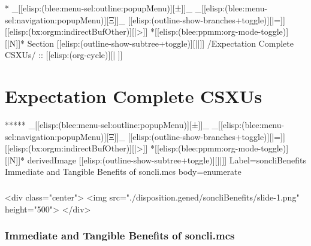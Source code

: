 \begin{whenOrg}
\begin{whenOrg}
*  _[[elisp:(blee:menu-sel:outline:popupMenu)][±]]_ _[[elisp:(blee:menu-sel:navigation:popupMenu)][Ξ]]_ [[elisp:(outline-show-branches+toggle)][|=]] [[elisp:(bx:orgm:indirectBufOther)][|>]] *[[elisp:(blee:ppmm:org-mode-toggle)][|N]]*  Section    [[elisp:(outline-show-subtree+toggle)][||]]   /Expectation Complete CSXUs/ ::  [[elisp:(org-cycle)][| ]]
\end{whenOrg}

\section{Expectation Complete CSXUs}


\begin{whenOrg}
*****  _[[elisp:(blee:menu-sel:outline:popupMenu)][±]]_ _[[elisp:(blee:menu-sel:navigation:popupMenu)][Ξ]]_ [[elisp:(outline-show-branches+toggle)][|=]] [[elisp:(bx:orgm:indirectBufOther)][|>]] *[[elisp:(blee:ppmm:org-mode-toggle)][|N]]*  derivedImage [[elisp:(outline-show-subtree+toggle)][||]] Label=soncliBenefits Immediate and Tangible Benefits of soncli.mcs body=enumerate
\end{whenOrg}

\begin{htmlonly}

\begin{frame}[fragile,plain,label=soncliBenefits]
    \frametitle{}
    \framesubtitle{}
    \begin{rawhtml}
<div class="center">
<img src="./disposition.gened/soncliBenefits/slide-1.png" height="500">
</div>
    \end{rawhtml}
\end{frame}
\end{htmlonly}

\begin{verblatex}

\begin{frame}[fragile,plain,label=soncliBenefits]
    \frametitle{Immediate and Tangible Benefits of soncli.mcs}
    \framesubtitle{}



\end{frame}
\end{verblatex}
\end{whenOrg}
